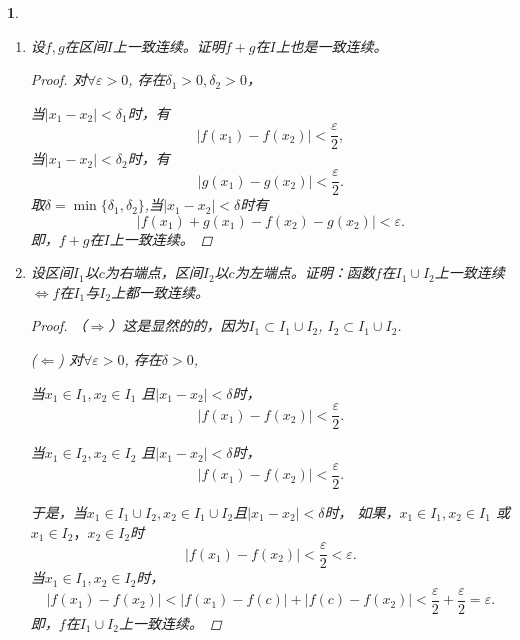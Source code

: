 \documentclass[utf8]{book}
\newtheorem{example}{}[section]             %
\begin{document}
\begin{example}
\renewcommand\labelenumi{\normalfont(\theenumi)}
\begin{enumerate}
\item 设$f,g$在区间$I$上一致连续。证明$f+g$在$I$上也是一致连续。
\begin{proof}
对$\forall \varepsilon > 0$, 存在$\delta_1 > 0, \delta_2 > 0$，

当$|x_1-x_2| < \delta_1$时，有
$$|f(x_1)-f(x_2)|<\frac{\varepsilon}{2},$$
当$|x_1-x_2| < \delta_2$时，有
$$|g(x_1)-g(x_2)|<\frac{\varepsilon}{2}.$$
取$\delta=\min\{\delta_1, \delta_2\}$,当$|x_1-x_2| < \delta$时有
$$|f(x_1)+g(x_1)-f(x_2)-g(x_2)|<\varepsilon.$$
即，$f+g$在$I$上一致连续。
\end{proof}
\item 设区间$I_1$以$c$为右端点，区间$I_2$以$c$为左端点。证明：函数$f$在$I_1\cup I_2$上一致连续$\iff$$f$在$I_1$与$I_2$上都一致连续。
\begin{proof}
（$\Rightarrow$）这是显然的的，因为$I_1\subset I_1\cup I_2$, $I_2\subset I_1\cup I_2$.

($\Leftarrow$) 对$\forall \varepsilon > 0$, 存在$\delta > 0$,

当$x_1\in I_1, x_2\in I_1$ 且$|x_1-x_2| < \delta$时，
$$|f(x_1)-f(x_2)| < \frac{\varepsilon}{2}.$$ 


当$x_1\in I_2, x_2\in I_2$ 且$|x_1-x_2| < \delta$时，
$$|f(x_1)-f(x_2)| < \frac{\varepsilon}{2}.$$ 

于是，当$x_1\in I_1\cup I_2, x_2\in I_1\cup I_2$且$|x_1-x_2| < \delta$时，
如果，$x_1\in I_1, x_2\in I_1$ 或$x_1\in I_2， x_2\in I_2$时
$$|f(x_1)-f(x_2)| < \frac{\varepsilon}{2} < \varepsilon.$$
当$x_1\in I_1, x_2\in I_2$时，
$$|f(x_1)-f(x_2)| < |f(x_1)-f(c)| + |f(c)- f(x_2)| < \frac{\varepsilon}{2} + \frac{\varepsilon}{2} = \varepsilon.$$
即，$f$在$I_1\cup I_2$上一致连续。
\end{proof}
\end{enumerate}
\end{example}
\end{document}
